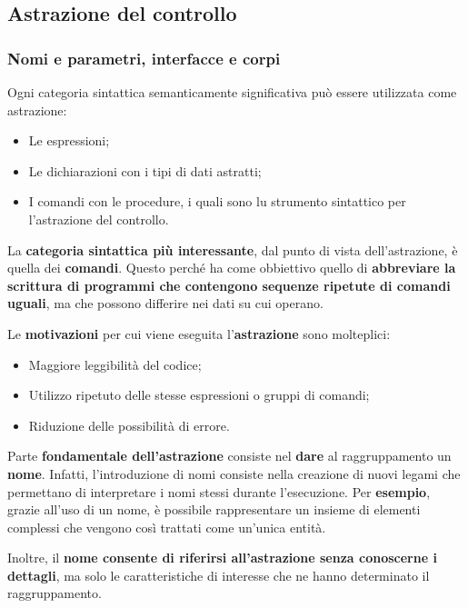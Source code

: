 \documentclass[a4paper]{article}
\begin{document}
 	\subsection{Astrazione del controllo}
 	
 	\subsubsection{Nomi e parametri, interfacce e corpi}
 	
 	Ogni categoria sintattica semanticamente significativa può essere utilizzata come astrazione:
 	\begin{itemize}
 		\item Le espressioni;
 		
 		\item Le dichiarazioni con i tipi di dati astratti;
 		
 		\item I comandi con le procedure, i quali sono lu strumento sintattico per l'astrazione del controllo.
 	\end{itemize}
 	La \textbf{categoria sintattica più interessante}, dal punto di vista dell'astrazione, è quella dei \textbf{comandi}. Questo perché ha come obbiettivo quello di \textbf{abbreviare la scrittura di programmi che contengono sequenze ripetute di comandi uguali}, ma che possono differire nei dati su cui operano.\newline
 	
 	\noindent
 	Le \textbf{motivazioni} per cui viene eseguita l'\textbf{astrazione} sono molteplici:
 	\begin{itemize}
 		\item Maggiore leggibilità del codice;
 		\item Utilizzo ripetuto delle stesse espressioni o gruppi di comandi;
 		\item Riduzione delle possibilità di errore.
 	\end{itemize}
 	
 	\noindent
 	Parte \textbf{fondamentale dell'astrazione} consiste nel \textbf{dare} al raggruppamento un \textcolor{Red3}{\textbf{nome}}. Infatti, l'introduzione di nomi consiste nella creazione di nuovi legami che permettano di interpretare i nomi stessi durante l'esecuzione. Per \textcolor{Green4}{\textbf{esempio}}, grazie all'uso di un nome, è possibile rappresentare un insieme di elementi complessi che vengono così trattati come un'unica entità.
 	
 	Inoltre, il \textbf{nome consente di riferirsi all'astrazione senza conoscerne i dettagli}, ma solo le caratteristiche di interesse che ne hanno determinato il raggruppamento.\newline
 	
\end{document}
